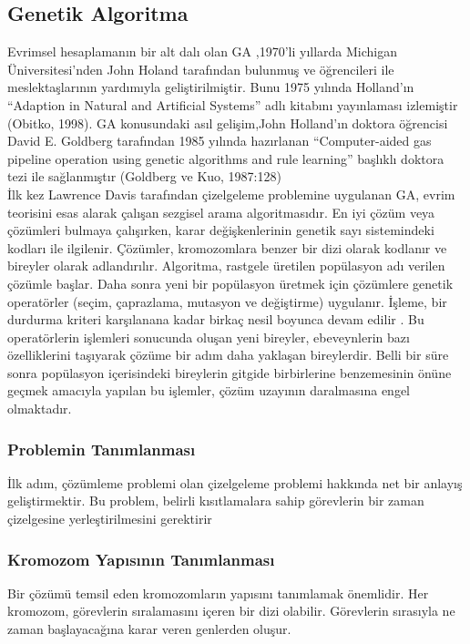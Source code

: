 \documentclass[12pt, a4paper]{article}
\begin{document}
\begin{flushleft}
	\subsection{Genetik Algoritma }
	Evrimsel hesaplamanın bir alt dalı olan GA ,1970’li yıllarda Michigan 
	Üniversitesi’nden John Holand tarafından bulunmuş ve öğrencileri ile meslektaşlarının 
	yardımıyla geliştirilmiştir. Bunu 1975 yılında Holland’ın “Adaption in Natural and Artificial Systems” adlı kitabını yayınlaması izlemiştir \cite{holland1992adaptation}(Obitko, 1998). GA konusundaki asıl gelişim,John Holland’ın doktora öğrencisi David E. Goldberg tarafından 1985 yılında hazırlanan “Computer-aided gas pipeline operation using genetic algorithms and rule learning” başlıklı doktora tezi ile sağlanmıştır \cite{goldberg1987genetic}(Goldberg ve Kuo, 1987:128)\\[10pt]
	
	İlk kez Lawrence Davis\cite{kelly1991hybrid} tarafından çizelgeleme problemine uygulanan GA, evrim teorisini 
	esas alarak çalışan sezgisel arama algoritmasıdır. En iyi çözüm veya çözümleri bulmaya 
	çalışırken, karar değişkenlerinin genetik sayı sistemindeki kodları ile ilgilenir. Çözümler, kromozomlara benzer bir dizi olarak kodlanır ve bireyler olarak adlandırılır. Algoritma, rastgele üretilen popülasyon adı verilen çözümle başlar. Daha sonra yeni bir popülasyon üretmek için çözümlere genetik operatörler (seçim, çaprazlama, mutasyon ve değiştirme) uygulanır. İşleme, bir durdurma kriteri karşılanana kadar birkaç nesil boyunca devam edilir . Bu operatörlerin işlemleri sonucunda oluşan yeni bireyler, 
	ebeveynlerin bazı özelliklerini taşıyarak çözüme bir adım daha yaklaşan bireylerdir. Belli bir süre sonra popülasyon içerisindeki bireylerin gitgide birbirlerine benzemesinin önüne 
   	geçmek amacıyla yapılan bu işlemler, çözüm uzayının daralmasına engel olmaktadır. 
	
		\subsubsection{Problemin Tanımlanması}
		İlk adım, çözümleme problemi olan çizelgeleme problemi hakkında net bir anlayış geliştirmektir. Bu problem, belirli kısıtlamalara sahip görevlerin bir zaman çizelgesine yerleştirilmesini gerektirir
		\subsubsection{Kromozom Yapısının Tanımlanması}
		Bir çözümü temsil eden kromozomların yapısını tanımlamak önemlidir. Her kromozom, görevlerin sıralamasını içeren bir dizi olabilir. Görevlerin sırasıyla ne zaman başlayacağına karar veren genlerden oluşur.

\end{flushleft}
\end{document}
